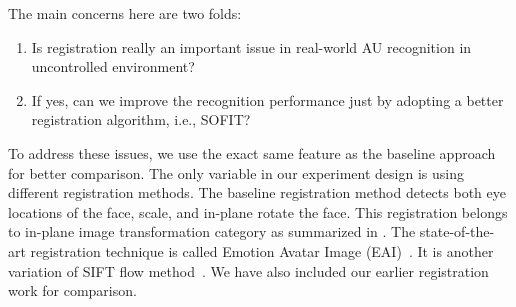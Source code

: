 \documentclass[10pt,journal]{IEEEtran}
\begin{document}
The main concerns here are two folds:
\begin{enumerate}
\item Is registration really an important issue in real-world AU recognition in uncontrolled environment?
\item If yes, can we improve the recognition performance just by adopting a better registration algorithm, i.e., SOFIT?
\end{enumerate}

To address these issues, we use the exact same feature as the baseline approach for better comparison. The only variable in our experiment design is using different registration methods. The baseline registration method detects both eye locations of the face, scale, and in-plane rotate the face. This registration belongs to in-plane image transformation category as summarized in \cite{Yang_SMCB12}. The state-of-the-art registration technique is called Emotion Avatar Image (EAI)~\cite{Yang_SMCB12}. It is another variation of SIFT flow method~\cite{Liu_PAMI11}. We have also included our earlier registration work \cite{Yang_FG13} for comparison.
\end{document}
